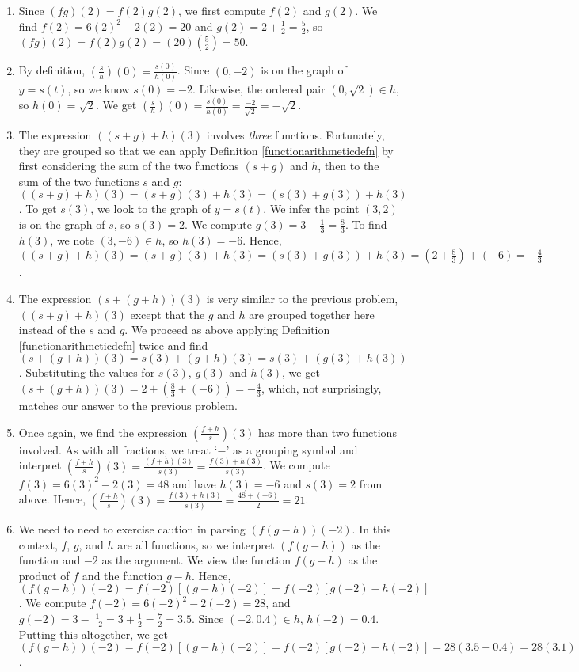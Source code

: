 \begin{ex}
\begin{enumerate}
\begin{enumerate}
\item Since $(fg)(2) = f(2)g(2)$, we first  compute $f(2)$ and $g(2)$. We find $f(2) = 6(2)^2-2(2) = 20$ and $g(2) = 2 + \frac{1}{2} = \frac{5}{2}$, so $(fg)(2) = f(2) g(2) = (20)\left(\frac{5}{2}\right) = 50$.

\item By definition, $\left( \frac{s}{h} \right)(0) = \frac{s(0)}{h(0)}$.  Since $(0, -2)$ is on the graph of $y=s(t)$, so we know $s(0)  = -2$.  Likewise, the ordered pair $(0, \sqrt{2}) \in h$, so $h(0) = \sqrt{2}$.  We get  $\left( \frac{s}{h} \right)(0) = \frac{s(0)}{h(0)} = \frac{-2}{\sqrt{2}} = -\sqrt{2}$.

\item  The expression $((s+g)+h)(3)$ involves \textit{three} functions.  Fortunately, they are grouped so that we can apply Definition \ref{functionarithmeticdefn} by first considering the sum of the two functions $(s+g)$ and $h$, then to the sum of the two functions $s$ and $g$: $((s+g)+h)(3) = (s+g)(3)+h(3) = (s(3)+g(3))+h(3)$.  To get $s(3)$, we look to the graph of $y = s(t)$.  We infer the point $(3,2)$ is on the graph of $s$, so $s(3) = 2$.  We compute $g(3) = 3-\frac{1}{3} = \frac{8}{3}$.  To find $h(3)$, we note $(3, -6) \in h$, so $h(3) = -6$.  Hence, $((s+g)+h)(3) = (s+g)(3)+h(3) = (s(3)+g(3))+h(3) = \left(2+\frac{8}{3}\right) + (-6) = -\frac{4}{3}$.

\item The expression   $(s+(g+h))(3)$ is very similar to the previous problem, $((s+g)+h)(3)$ except that the $g$ and $h$ are grouped together here instead of the $s$ and $g$.  We proceed as above applying Definition \ref{functionarithmeticdefn} twice and find $(s+(g+h))(3) = s(3) + (g+h)(3) = s(3)+(g(3)+h(3))$.  Substituting the values for $s(3)$, $g(3)$ and $h(3)$, we get   $(s+(g+h))(3) = 2 + \left(\frac{8}{3} + (-6)\right)  = -\frac{4}{3}$, which, not surprisingly, matches our answer to the previous problem.

\item  Once again, we find the expression  $\left(\frac{f+h}{s}\right)(3)$ has more than two functions involved.  As with all fractions, we treat `$-$' as a grouping symbol and interpret  $\left(\frac{f+h}{s}\right)(3) = \frac{(f+h)(3)}{s(3)} = \frac{f(3)+h(3)}{s(3)}$.  We compute $f(3) = 6(3)^2-2(3) = 48$ and have $h(3) = -6$ and $s(3) = 2$ from above.  Hence, $\left(\frac{f+h}{s}\right)(3) =  \frac{f(3)+h(3)}{s(3)} = \frac{48+(-6)}{2} = 21$.

\item We need to need to exercise caution in parsing $(f(g-h))(-2)$.  In this context, $f$, $g$, and $h$ are all functions, so we interpret $(f(g-h))$ as the function and $-2$ as the argument. We view the function $f(g-h)$ as the product of $f$ and the function $g-h$.  Hence, $(f(g-h))(-2) = f(-2) [(g-h)(-2)] = f(-2) [g(-2) - h(-2)]$.  We compute $f(-2) = 6(-2)^2-2(-2) = 28$, and $g(-2)= 3 - \frac{1}{-2} = 3 + \frac{1}{2} = \frac{7}{2} = 3.5$.  Since $(-2, 0.4) \in h$, $h(-2) = 0.4$.  Putting this altogether, we get $(f(g-h))(-2) = f(-2) [(g-h)(-2)] = f(-2) [g(-2) - h(-2)] = 28(3.5-0.4) = 28(3.1) = 86.8$.


\end{enumerate}
\end{enumerate}
\end{ex}
